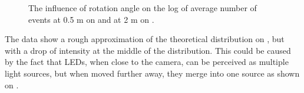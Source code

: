 \begin{figure}[H]
	\centering
	\caption{
  The influence of rotation angle on the log of average number of events at 0.5 m on  and at 2 m on .
  }
	\label{fig:angles}
\end{figure}
The data show a rough approximation of the theoretical distribution on ,
but with a drop of intensity at the middle of the distribution. This could be caused
by the fact that \ac{LED}s, when close to the camera, can be perceived as multiple light sources,
but when moved further away, they merge into one source as shown on .

